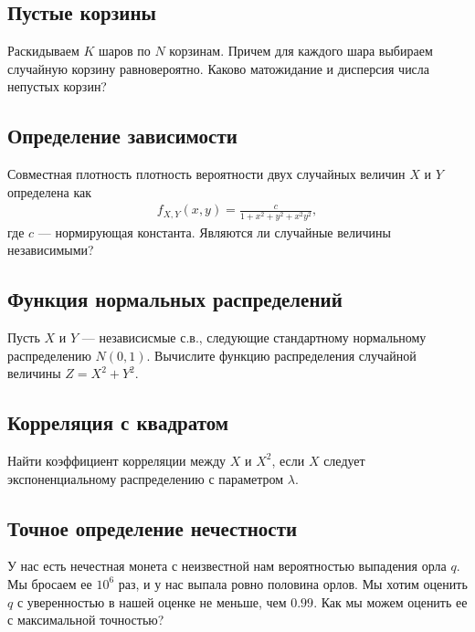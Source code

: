 \documentclass[12pt]{article}
\begin{document}
\subsection{Пустые корзины}

Раскидываем $K$ шаров по $N$ корзинам. Причем для каждого шара выбираем случайную корзину равновероятно. Каково матожидание и дисперсия числа непустых корзин?



\subsection{Определение зависимости}

Совместная плотность плотность вероятности двух случайных величин $X$ и $Y$ определена как
\begin{align*}
    f_{X, Y}(x, y) = \frac{c}{1 + x^2 + y^2 + x^2y^2},
\end{align*}
где $c$ --- нормирующая константа. Являются ли случайные величины независимыми?



\subsection{Функция нормальных распределений}

Пусть $X$ и $Y$ --- независисмые с.в., следующие стандартному нормальному распределению $N(0, 1)$. Вычислите функцию распределения случайной величины $Z = X^2 + Y^2$.



\subsection{Корреляция с квадратом}

Найти коэффициент корреляции между $X$ и $X^2$, если $X$ следует экспоненциальному распределению с параметром $\lambda$.



\subsection{Точное определение нечестности}

У нас есть нечестная монета с неизвестной нам вероятностью выпадения орла $q$. Мы бросаем ее $10^6$ раз, и у нас выпала ровно половина орлов. Мы хотим оценить $q$ с уверенностью в нашей оценке не меньше, чем $0.99$. Как мы можем оценить ее с максимальной точностью? 
\end{document}
